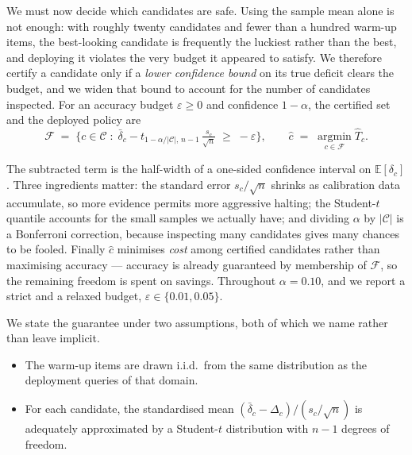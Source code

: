\documentclass[acmsmall]{acmart}
\theoremstyle{acmdefinition}%
\theoremstyle{acmplain}}{}%
\begin{document}
We must now decide which candidates are safe. Using the sample mean alone is not enough: with roughly twenty candidates and fewer than a hundred warm-up items, the best-looking candidate is frequently the luckiest rather than the best, and deploying it violates the very budget it appeared to satisfy. We therefore certify a candidate only if a \emph{lower confidence bound} on its true deficit clears the budget, and we widen that bound to account for the number of candidates inspected. For an accuracy budget $\varepsilon \geq 0$ and confidence $1-\alpha$, the certified set and the deployed policy are
\begin{equation}
\mathcal{F} \;=\; \Big\{ c \in \mathcal{C} \;:\; \bar\delta_c - t_{1-\alpha/|\mathcal{C}|,\, n-1}\,\tfrac{s_c}{\sqrt{n}} \;\geq\; -\varepsilon \Big\},
\qquad
\hat c \;=\; \operatorname*{argmin}_{c \in \mathcal{F}} \hat T_c .
\label{eq:select}
\end{equation}

The subtracted term is the half-width of a one-sided confidence interval on $\mathbb{E}[\delta_c]$. Three ingredients matter: the standard error $s_c/\sqrt{n}$ shrinks as calibration data accumulate, so more evidence permits more aggressive halting; the Student-$t$ quantile accounts for the small samples we actually have; and dividing $\alpha$ by $|\mathcal{C}|$ is a Bonferroni correction, because inspecting many candidates gives many chances to be fooled. Finally $\hat c$ minimises \emph{cost} among certified candidates rather than maximising accuracy --- accuracy is already guaranteed by membership of $\mathcal{F}$, so the remaining freedom is spent on savings. Throughout $\alpha = 0.10$, and we report a strict and a relaxed budget, $\varepsilon \in \{0.01, 0.05\}$.

We state the guarantee under two assumptions, both of which we name rather than leave implicit.

\begin{itemize}
\item[\textbf{(A1)}] The warm-up items are drawn i.i.d.\ from the same distribution as the deployment queries of that domain.
\item[\textbf{(A2)}] For each candidate, the standardised mean $(\bar\delta_c - \Delta_c)/(s_c/\sqrt{n})$ is adequately approximated by a Student-$t$ distribution with $n-1$ degrees of freedom.
\end{itemize}
\end{document}
